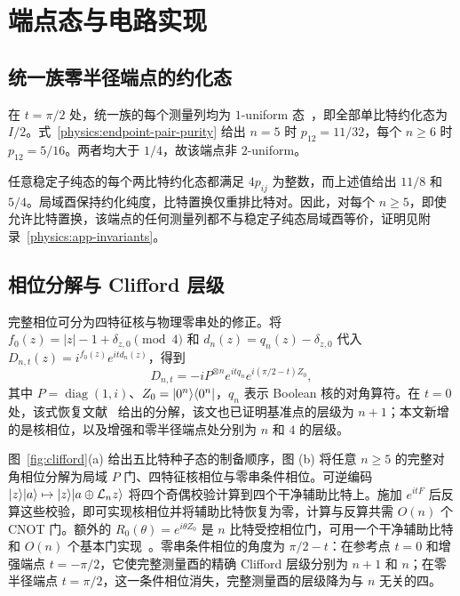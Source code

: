 \section{端点态与电路实现}
\label{physics:section}

\subsection{统一族零半径端点的约化态}
\label{physics:endpoints}

在 $t=\pi/2$ 处，统一族的每个测量列均为 $1$-uniform 态~\cite{Scott2004}，即全部单比特约化态为 $I/2$。式~\eqref{physics:endpoint-pair-purity} 给出 $n=5$ 时 $p_{12}=11/32$，每个 $n\ge6$ 时 $p_{12}=5/16$。两者均大于 $1/4$，故该端点非 $2$-uniform。

任意稳定子纯态的每个两比特约化态都满足 $4p_{ij}$ 为整数，而上述值给出 $11/8$ 和 $5/4$。局域酉保持约化纯度，比特置换仅重排比特对。因此，对每个 $n\ge5$，即使允许比特置换，该端点的任何测量列都不与稳定子纯态局域酉等价，证明见附录~\ref{physics:app-invariants}。

\subsection{相位分解与 Clifford 层级}
\label{physics:implementation}

完整相位可分为四特征核与物理零串处的修正。将 $f_0(z)=|z|-1+\delta_{z,0}\pmod4$ 和 $d_n(z)=q_n(z)-\delta_{z,0}$ 代入 $D_{n,t}(z)=i^{f_0(z)}e^{itd_n(z)}$，得到
\begin{equation}
 D_{n,t}=-iP^{\otimes n}e^{itq_n}e^{i(\pi/2-t)Z_0},
 \label{physics:factorization}
\end{equation}
其中 $P=\operatorname{diag}(1,i)$、$Z_0=\lvert 0^n\rangle\langle 0^n\rvert$，$q_n$ 表示 Boolean 核的对角算符。在 $t=0$ 处，该式恢复文献~\cite{PauwelsGisin2026} 给出的分解，该文也已证明基准点的层级为 $n+1$；本文新增的是核相位，以及增强和零半径端点处分别为 $n$ 和 $4$ 的层级。


图~\ref{fig:clifford}(a) 给出五比特种子态的制备顺序，图 (b) 将任意 $n\ge5$ 的完整对角相位分解为局域 $P$ 门、四特征核相位与零串条件相位。可逆编码 $\lvert z\rangle\lvert a\rangle\mapsto\lvert z\rangle\lvert a\oplus\mathcal L_nz\rangle$ 将四个奇偶校验计算到四个干净辅助比特上。施加 $e^{itF}$ 后反算这些校验，即可实现核相位并将辅助比特恢复为零，计算与反算共需 $O(n)$ 个 CNOT 门。额外的 $R_0(\theta)=e^{i\theta Z_0}$ 是 $n$ 比特受控相位门，可用一个干净辅助比特和 $O(n)$ 个基本门实现~\cite{Barenco1995}。零串条件相位的角度为 $\pi/2-t$：在参考点 $t=0$ 和增强端点 $t=-\pi/2$，它使完整测量酉的精确 Clifford 层级分别为 $n+1$ 和 $n$；在零半径端点 $t=\pi/2$，这一条件相位消失，完整测量酉的层级降为与 $n$ 无关的四。

